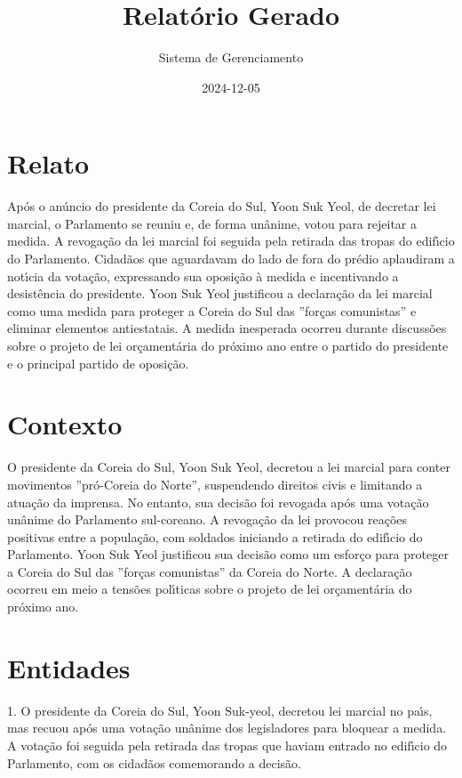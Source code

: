 \documentclass[article,11pt,oneside,a4paper,brazil,sumario=tradicional]{abntex2}%
\title{Relatório Gerado}%
\author{Sistema de Gerenciamento}%
\date{2024{-}12{-}05}%
\begin{document}
%
\normalsize%
\maketitle%
%
\frenchspacing%
\section{Relato}%
\label{sec:Relato}%
Ap\'os o an\'uncio do presidente da Coreia do Sul, Yoon Suk Yeol, de decretar lei marcial, o Parlamento se reuniu e, de forma un\^anime, votou para rejeitar a medida. A revoga\c{c}\~ao da lei marcial foi seguida pela retirada das tropas do edif{\'\i}cio do Parlamento. Cidad\~aos que aguardavam do lado de fora do pr\'edio aplaudiram a not{\'\i}cia da vota\c{c}\~ao, expressando sua oposi\c{c}\~ao \`a medida e incentivando a desist\^encia do presidente. Yoon Suk Yeol justificou a declara\c{c}\~ao da lei marcial como uma medida para proteger a Coreia do Sul das ''for\c{c}as comunistas'' e eliminar elementos antiestatais. A medida inesperada ocorreu durante discuss\~oes sobre o projeto de lei or\c{c}ament\'aria do pr\'oximo ano entre o partido do presidente e o principal partido de oposi\c{c}\~ao.

%
\section{Contexto}%
\label{sec:Contexto}%
O presidente da Coreia do Sul, Yoon Suk Yeol, decretou a lei marcial para conter movimentos ''pr\'o-Coreia do Norte'', suspendendo direitos civis e limitando a atua\c{c}\~ao da imprensa. No entanto, sua decis\~ao foi revogada ap\'os uma vota\c{c}\~ao un\^anime do Parlamento sul-coreano. A revoga\c{c}\~ao da lei provocou rea\c{c}\~oes positivas entre a popula\c{c}\~ao, com soldados iniciando a retirada do edif{\'\i}cio do Parlamento. Yoon Suk Yeol justificou sua decis\~ao como um esfor\c{c}o para proteger a Coreia do Sul das ''for\c{c}as comunistas'' da Coreia do Norte. A declara\c{c}\~ao ocorreu em meio a tens\~oes pol{\'\i}ticas sobre o projeto de lei or\c{c}ament\'aria do pr\'oximo ano.

%
\section{Entidades}%
\label{sec:Entidades}%
1. O presidente da Coreia do Sul, Yoon Suk-yeol, decretou lei marcial no pa{\'\i}s, mas recuou ap\'os uma vota\c{c}\~ao un\^anime dos legisladores para bloquear a medida. A vota\c{c}\~ao foi seguida pela retirada das tropas que haviam entrado no edif{\'\i}cio do Parlamento, com os cidad\~aos comemorando a decis\~ao.
\end{document}
